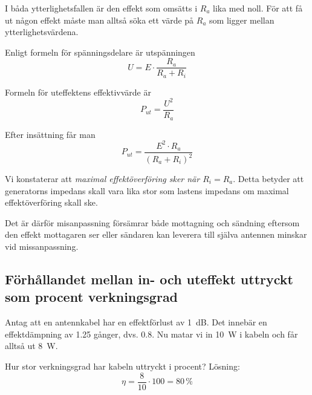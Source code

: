 I båda ytterlighetsfallen är den effekt som omsätts i \(R_a\) lika med noll.
För att få ut någon effekt måste man alltså söka ett värde på \(R_a\) som
ligger mellan ytterlighetsvärdena.

Enligt formeln för spänningsdelare är utspänningen
\[   U = E \cdot \dfrac{R_a}{R_a+R_i}	\]

Formeln för uteffektens effektivvärde är
\[   P_{ut} = \dfrac{U^2}{R_a} 	\]

Efter insättning får man
\[   P_{ut} = \dfrac{E^2 \cdot R_a}{(R_a + R_i)^2}   \]


Vi konstaterar att \emph{maximal effektöverföring sker när \(R_i = R_a\)}. 
Detta betyder att generatorns impedans skall vara lika stor som lastens 
impedans om maximal effektöverföring skall ske. 

Det är därför misanpassning försämrar både mottagning och sändning eftersom den 
effekt mottagaren ser eller sändaren kan leverera till själva antennen minskar 
vid missanpassning.

\subsection{Förhållandet mellan in- och uteffekt uttryckt som procent verkningsgrad}

Antag att en antennkabel har en effektförlust av \SI{1}{dB}.
Det innebär en effektdämpning av \num{1,25} gånger, dvs. \num{0,8}.
Nu matar vi in \SI{10}{W} i kabeln och får alltså ut \SI{8}{W}.

Hur stor verkningsgrad har kabeln uttryckt i procent?
Lösning:
\[   \eta = \dfrac{8}{10} \cdot 100 = 80\,\%   \]
